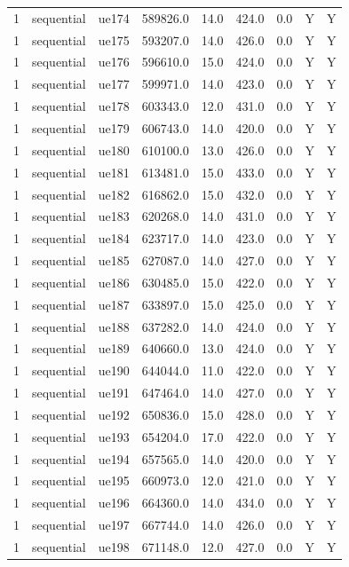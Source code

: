 \begin{table}[ht]
\begin{tabular}{|c|c|c|c|c|c|c|c|c|}
1 & sequential & ue174 & 589826.0 & 14.0 & 424.0 & 0.0 & Y & Y \\
1 & sequential & ue175 & 593207.0 & 14.0 & 426.0 & 0.0 & Y & Y \\
1 & sequential & ue176 & 596610.0 & 15.0 & 424.0 & 0.0 & Y & Y \\
1 & sequential & ue177 & 599971.0 & 14.0 & 423.0 & 0.0 & Y & Y \\
1 & sequential & ue178 & 603343.0 & 12.0 & 431.0 & 0.0 & Y & Y \\
1 & sequential & ue179 & 606743.0 & 14.0 & 420.0 & 0.0 & Y & Y \\
1 & sequential & ue180 & 610100.0 & 13.0 & 426.0 & 0.0 & Y & Y \\
1 & sequential & ue181 & 613481.0 & 15.0 & 433.0 & 0.0 & Y & Y \\
1 & sequential & ue182 & 616862.0 & 15.0 & 432.0 & 0.0 & Y & Y \\
1 & sequential & ue183 & 620268.0 & 14.0 & 431.0 & 0.0 & Y & Y \\
1 & sequential & ue184 & 623717.0 & 14.0 & 423.0 & 0.0 & Y & Y \\
1 & sequential & ue185 & 627087.0 & 14.0 & 427.0 & 0.0 & Y & Y \\
1 & sequential & ue186 & 630485.0 & 15.0 & 422.0 & 0.0 & Y & Y \\
1 & sequential & ue187 & 633897.0 & 15.0 & 425.0 & 0.0 & Y & Y \\
1 & sequential & ue188 & 637282.0 & 14.0 & 424.0 & 0.0 & Y & Y \\
1 & sequential & ue189 & 640660.0 & 13.0 & 424.0 & 0.0 & Y & Y \\
1 & sequential & ue190 & 644044.0 & 11.0 & 422.0 & 0.0 & Y & Y \\
1 & sequential & ue191 & 647464.0 & 14.0 & 427.0 & 0.0 & Y & Y \\
1 & sequential & ue192 & 650836.0 & 15.0 & 428.0 & 0.0 & Y & Y \\
1 & sequential & ue193 & 654204.0 & 17.0 & 422.0 & 0.0 & Y & Y \\
1 & sequential & ue194 & 657565.0 & 14.0 & 420.0 & 0.0 & Y & Y \\
1 & sequential & ue195 & 660973.0 & 12.0 & 421.0 & 0.0 & Y & Y \\
1 & sequential & ue196 & 664360.0 & 14.0 & 434.0 & 0.0 & Y & Y \\
1 & sequential & ue197 & 667744.0 & 14.0 & 426.0 & 0.0 & Y & Y \\
1 & sequential & ue198 & 671148.0 & 12.0 & 427.0 & 0.0 & Y & Y \\

\end{tabular}
\end{table}
